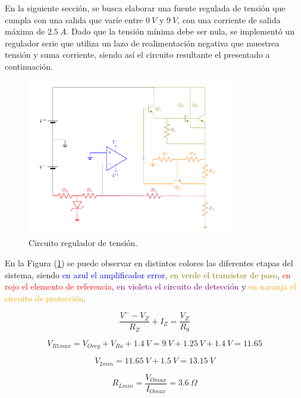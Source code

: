 En la siguiente sección, se busca elaborar una fuente regulada de tensión que cumpla con una salida que varíe entre $0 \ V$ y $9 \ V$, con una corriente de salida máxima de $2.5 \ A$. Dado que la tensión mínima debe ser nula, se implementó un regulador serie que utiliza un lazo de realimentación negativa que muestrea tensión y suma corriente, siendo así el circuito resultante el presentado a continuación.
\begin{figure}[H]
\centering
	\includegraphics[width=0.8\textwidth, page=1]{ImagenesEjercicio2/Regulador.pdf}
	\caption{Circuito regulador de tensión.}
	\label{fig:circuito1}
\end{figure}

En la Figura (\ref{fig:circuito1}) se puede observar en distintos colores las diferentes etapas del sistema, siendo \textcolor{blue}{en azul el amplificador error}, \textcolor{olive}{en verde el transistor de paso}, \textcolor{red}{en rojo el elemento de referencia}, \textcolor{purple}{en violeta el circuito de detección} y \textcolor{orange}{en naranja el circuito de protección}.

\begin{equation}
\frac{V^- - V_Z}{R_Z} + I_Z = \frac{V_Z}{R_9}
\end{equation}

\begin{equation}
V_{B1max} = V_{Oreg} + V_{Ra} + 1.4 \ V = 9 \ V + 1.25 \ V + 1.4 \ V = 11.65
\end{equation}

\begin{equation}
V_{2min} = 11.65 \ V + 1.5 \ V = 13.15 \ V
\end{equation}

\begin{equation}
	R_{Lmin} = \frac{V_{Omax}}{I_{Omax}} = 3.6 \ \Omega
\end{equation}

